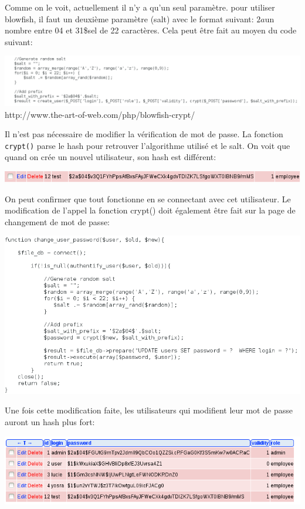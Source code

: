 \documentclass{article}
\begin{document}
Comme on le voit, actuellement il n'y a qu'un seul paramètre. pour
utiliser blowfish, il faut un deuxième paramètre (salt) avec le format
suivant: \(2a\)un nombre entre 04 et 31\$sel de 22 caractères. Cela peut
être fait au moyen du code suivant:

\includegraphics[width=\textwidth]{images/crypt_apres.PNG}
http://www.the-art-of-web.com/php/blowfish-crypt/

Il n'est pas nécessaire de modifier la vérification de mot de passe. La
fonction \texttt{crypt()} parse le hash pour retrouver l'algorithme
utilisé et le salt. On voit que quand on crée un nouvel utilisateur, son
hash est différent:

\includegraphics[width=\textwidth]{images/crypt_apres2.PNG}

On peut confirmer que tout fonctionne en se connectant avec cet
utilisateur. Le modification de l'appel la fonction crypt() doit
également être fait sur la page de changement de mot de passe:

\includegraphics[width=\textwidth]{images/crypt_apres3.PNG}

Une fois cette modification faite, les utilisateurs qui modifient leur
mot de passe auront un hash plus fort:

\includegraphics[width=\textwidth]{images/crypt_apres4.PNG}
\end{document}
